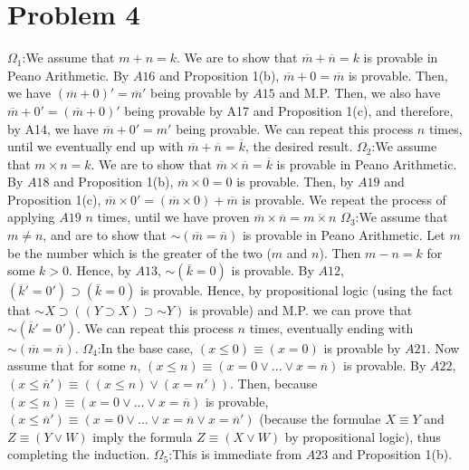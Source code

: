 \documentclass{article}
\newcommand*{\oldneg}{\mathord{\sim}}
\theoremstyle{definition}
\begin{document}
\section*{Problem 4}
$\Omega_1$:\newline We assume that $m+n=k$. We are to show that $\overline m+\overline n=k$ is provable in Peano Arithmetic. By $A16$ and Proposition 1(b),  
$\overline m+0=\overline m$ is provable. Then, we have $(\overline m+0)'=\overline m'$ being provable by $A15$ and M.P. Then, we also have $\overline m+0'=
(\overline m+0)'$ being provable by A17 and Proposition 1(c), 
and therefore, by A14, we have $\overline m+0'=m'$ being provable. We can repeat this process $n$ times, until we 
eventually end up with $\overline m+\overline n=\overline k$, the desired result.\newline 
$\Omega_2$:\newline We assume that $m\times n=k$. We are to show that $\overline m\times\overline n=\overline k$ is provable in Peano Arithmetic.  
By $A18$ and Proposition 1(b), $\overline m\times 0=0$ is 
provable. Then, by $A19$ and Proposition 1(c), 
$\overline m\times 0'=(\overline m\times 0)+\overline m$ is provable. We repeat the process of applying $A19$ $n$ times, until we 
have proven $\overline m\times \overline n=\overline{m\times n}$\newline
$\Omega_3$:\newline We assume that $m\ne n$, and are to show that $\oldneg (\overline m=\overline n)$ is provable in Peano Arithmetic. Let $m$ be the number 
which is the greater of the two ($m$ and $n$). Then $m-n=k$ for some $k>0$.  
Hence, by $A13$, $\oldneg (\overline k=0)$ is provable. 
By $A12$, $(\overline k'=0')\supset (\overline k=0)$ is provable. Hence, by propositional logic (using the fact 
that $\oldneg X\supset ((Y\supset X)\supset \oldneg Y)$ 
is provable) and M.P. we can prove that $\oldneg (\overline k'=0')$. We can repeat this process $n$ times, 
eventually ending with $\oldneg (\overline m=\overline n)$.\newline
$\Omega_4$:\newline In the base case, $(x\le 0)\equiv (x=0)$ is provable by $A21$. Now assume that for some $n$, $(x\le n)\equiv (x=0\vee ...\vee x=\overline 
n)$ is provable. By $A22$, $(x\le \overline n')\equiv ((x\le n)\vee (x=n'))$. Then, because $(x\le n)\equiv (x=0\vee ...\vee x=\overline n)$ is provable, 
$(x\le \overline n') \equiv (x=0\vee ...\vee x=\overline n\vee x=\overline n')$ (because the formulae $X\equiv Y$ and $Z\equiv (Y\vee W)$ imply the formula 
$Z\equiv (X\vee W)$ by propositional logic), thus completing the induction.\newline
$\Omega_5$:\newline This is immediate from $A23$ and Proposition 1(b).\newline
\end{document}
